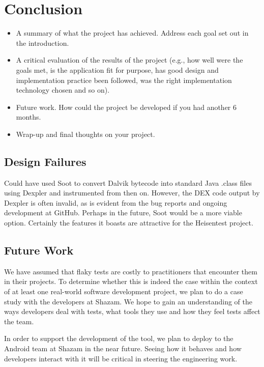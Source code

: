 \section{Conclusion}
\label{sec:conc}

\begin{mdframed}
	\begin{itemize}
		\item A summary of what the project has achieved. Address each goal set out
		in the introduction.
		\item A critical evaluation of the results of the project (e.g., how well
		were the goals met, is the application fit for purpose, has good design and
		implementation practice been followed, was the right implementation
		technology chosen and so on).
		\item Future work. How could the project be developed if you had another 6
		months.
		\item Wrap-up and final thoughts on your project.
	\end{itemize}
\end{mdframed}


\subsection{Design Failures}

Could have used Soot to convert Dalvik bytecode into standard Java .class files
using Dexpler \cite{bartel:soap2012} and instrumented from then on. However, the
DEX code output by Dexpler is often invalid, as is evident from the bug reports
and ongoing development at GitHub. Perhaps in the future, Soot would be a more
viable option. Certainly the features it boasts are attractive for the
Heisentest project.


\subsection{Future Work}

We have assumed that flaky tests are costly to practitioners that encounter them
in their projects. To determine whether this is indeed the case within the
context of at least one real-world software development project, we plan to do a
case study with the developers at Shazam. We hope to gain an understanding of
the ways developers deal with \flaky tests, what tools they use and how they
feel \flaky tests affect the team.

In order to support the development of the tool, we plan to deploy \splatter to
the Android team at Shazam in the near future. Seeing how it behaves and how
developers interact with it will be critical in steering the engineering work.

